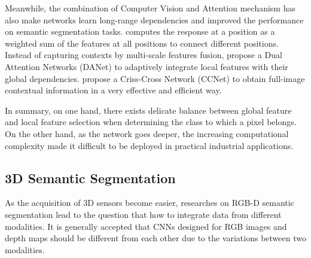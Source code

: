 ﻿\documentclass[journal]{IEEEtran}
\begin{document}
 
    Meanwhile, the combination of Computer Vision and Attention mechanism has also make networks learn long-range dependencies and improved the performance on semantic segmentation tasks. \cite{NonLocal2018} computes the response at a position as a weighted sum of the features at all positions to connect different positions. Instead of capturing contexts by multi-scale features fusion, \cite{fu2019dual} propose a Dual Attention Networks (DANet) to adaptively integrate local features with their global dependencies. \cite{huang2018ccnet} propose a Criss-Cross Network (CCNet) to obtain full-image contextual information in a very effective and efficient way.
    
 
    In summary, on one hand, there exists delicate balance between global feature and local feature selection when determining the class to which a pixel belongs. On the other hand, as the network goes deeper, the increasing computational complexity made it difficult to be deployed in practical industrial applications.
    
\subsection{3D Semantic Segmentation}
 
    As the acquisition of 3D sensors become easier, researches on RGB-D semantic segmentation\cite{wang2021brief} lead to the question that how to integrate data from different modalities.  It is generally accepted that CNNs designed for RGB images and depth maps should be different from each other due to the variations between two modalities. 

    
 
\end{document}

